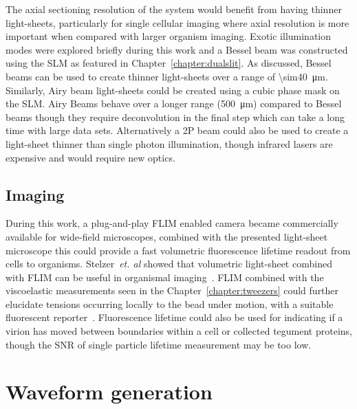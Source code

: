 The axial sectioning resolution of the system would benefit from having thinner light-sheets, particularly for single cellular imaging where axial resolution is more important when compared with larger organism imaging.
Exotic illumination modes were explored briefly during this work and a Bessel beam was constructed using the \gls{SLM} as featured in Chapter~\ref{chapter:dualslit}.
As discussed, Bessel beams can be used to create thinner light-sheets over a range of \SI{\sim40}{\micro\meter}.
Similarly, Airy beam light-sheets could be created using a cubic phase mask on the \gls{SLM}.
Airy Beams behave over a longer range (\SI{500}{\micro\meter}) compared to Bessel beams though they require deconvolution in the final step which can take a long time with large data sets.
Alternatively a \gls{2P} beam could also be used to create a light-sheet thinner than single photon illumination, though infrared lasers are expensive and would require new optics.

\subsection{Imaging}

During this work, a plug-and-play \gls{FLIM} enabled camera became commercially available for wide-field microscopes, combined with the presented light-sheet microscope this could provide a fast volumetric fluorescence lifetime readout from cells to organisms.
Stelzer~\emph{et. al} showed that volumetric light-sheet combined with FLIM can be useful in organismal imaging~\cite{gregerThreedimensionalFluorescenceLifetime2011a}.
FLIM combined with the viscoelastic measurements seen in the Chapter~\ref{chapter:tweezers} could further elucidate tensions occurring locally to the bead under motion, with a suitable fluorescent reporter~\cite{colomFluorescentMembraneTension2018}.
Fluorescence lifetime could also be used for indicating if a virion has moved between boundaries within a cell or collected tegument proteins, though the \gls{SNR} of single particle lifetime measurement may be too low.

\section{Waveform generation}


